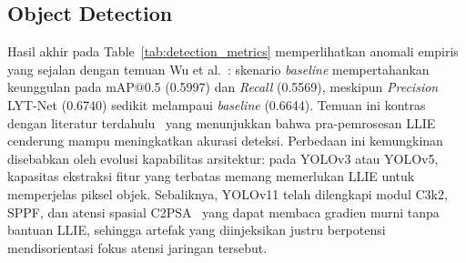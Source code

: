 \documentclass[conference]{IEEEtran}
\begin{document}
\begin{table}[htbp]
\centering
\caption{Quantitative Comparison of Image Quality and Spatial Feature 
Degradation Across LLIE Methods}
\label{tab:image_quality}
\end{table}


\subsection{Object Detection}
 
Hasil akhir pada Table~\ref{tab:detection_metrics} memperlihatkan anomali empiris yang sejalan dengan temuan Wu et al.~\cite{wu2024llieeffect}: skenario \textit{baseline} mempertahankan keunggulan pada mAP@0.5 (0.5997) dan \textit{Recall} (0.5569), meskipun \textit{Precision} LYT-Net (0.6740) sedikit melampaui \textit{baseline} (0.6644). Temuan ini kontras dengan literatur terdahulu~\cite{wang2023yolov5lowlight,shovo2024lowlight} yang menunjukkan bahwa pra-pemrosesan LLIE cenderung mampu meningkatkan akurasi deteksi. Perbedaan ini kemungkinan disebabkan oleh evolusi kapabilitas arsitektur: pada YOLOv3 atau YOLOv5, kapasitas ekstraksi fitur yang terbatas memang memerlukan LLIE untuk memperjelas piksel objek. Sebaliknya, YOLOv11 telah dilengkapi modul C3k2, SPPF, dan atensi spasial C2PSA~\cite{khanam2024yolov11} yang dapat membaca gradien murni tanpa bantuan LLIE, sehingga artefak yang diinjeksikan justru berpotensi mendisorientasi fokus atensi jaringan tersebut.
 
\end{document}
